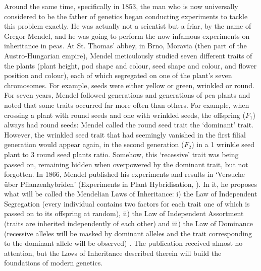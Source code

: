 Around the same time, specifically in 1853, the man who is now universally considered to be the father of genetics began conducting experiments to tackle this problem exactly. 
He was actually not a scientist but a friar, by the name of Gregor Mendel, and he was going to perform the now infamous experiments on inheritance in peas. 
At St. Thomas' abbey, in Brno, Moravia (then part of the Austro-Hungarian empire), Mendel meticulously studied seven different traits of the plants (plant height, pod shape and colour, seed shape and colour, and flower position and colour), each of which segregated on one of the plant's seven chromosomes. 
For example, seeds were either yellow or green, wrinkled or round. For seven years, Mendel followed generations and generations of pea plants and noted that some traits occurred far more often than others. 
For example, when crossing a plant with round seeds and one with wrinkled seeds, the offspring ($F_1$) always had round seeds: Mendel called the round seed trait the `dominant' trait. 
However, the wrinkled seed trait that had seemingly vanished in the first filial generation would appear again, in the second generation ($F_2$) in a 1 wrinkle seed plant to 3 round seed plants ratio. 
Somehow, this `recessive' trait was being passed on, remaining hidden when overpowered by the dominant trait, but not forgotten. 
In 1866, Mendel published his experiments and results in `Versuche über Pflanzenhybriden' (Experiments in Plant Hybridisation, \cite{mendel1996experiments}). 
In it, he proposes what will be called the Mendelian Laws of Inheritance: i) the Law of Independent Segregation (every individual contains two factors for each trait one of which is passed on to its offspring at random), ii) the Law of Independent Assortment (traits are inherited independently of each other) and iii) the Law of Dominance (recessive alleles will be masked by dominant alleles and the trait corresponding to the dominant allele will be observed) \cite{mendel1996experiments}. 
The publication received almost no attention, but the Laws of Inheritance described therein will build the foundations of modern genetics.\\

